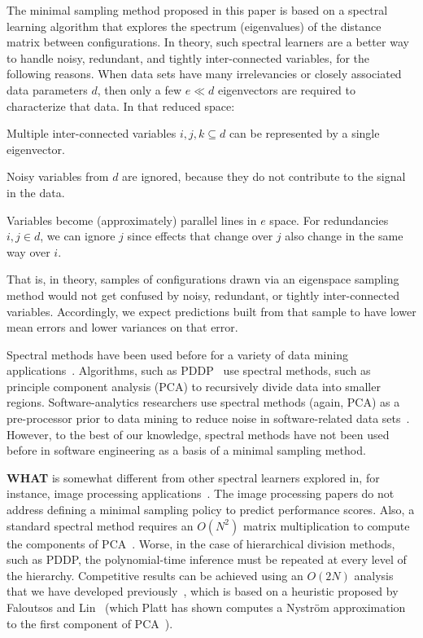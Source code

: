 \documentclass{sig-alternative}
\newcommand{\what}{{\bf WHAT }}
\begin{document}
The minimal sampling method proposed in this paper is based on a spectral learning algorithm
that  explores the spectrum (eigenvalues) of the distance matrix between  configurations.
In theory, such spectral learners are a better way to handle noisy, redundant, and tightly inter-connected variables, for the following reasons.
When data sets have many irrelevancies or closely associated data parameters $d$, then
only a few $e \ll d$ eigenvectors are required to characterize that data.
In that reduced space:
\begin{compactitem}
\item
Multiple inter-connected variables $i,j,k \subseteq d$ can be represented
by a single eigenvector.
\item
Noisy variables from $d$ are
ignored, because they  do not contribute to the signal in the data.
\item
Variables  become (approximately) parallel lines
in $e$ space. For  redundancies \mbox{$i,j \in d$}, we
can ignore $j$
since effects that change over $j$ also
change in the same way over $i$.
\end{compactitem}
That is, in theory, samples of configurations drawn via an eigenspace sampling method
would not get confused by noisy, redundant, or tightly inter-connected variables. Accordingly,
we expect predictions built from that sample to have  lower mean errors and lower variances on that error.

Spectral methods have been used before for a variety of data mining applications~\cite{kamvar2003spectral}.
Algorithms, such as PDDP~\cite{boley98} use spectral methods, such as principle component analysis (PCA) to
recursively divide data into smaller regions.  Software-analytics researchers use spectral methods (again, PCA) as a pre-processor prior to data mining  to reduce noise in software-related data sets~\cite{Theisen15}.
However, to the best of our knowledge, spectral methods have not been used before in software engineering as a basis of a minimal sampling method.


\what is somewhat different from other spectral
learners explored in, for instance, image processing applications~\cite{shi00}.
The image processing papers do not address
defining a minimal sampling policy to predict performance scores.
Also, a standard spectral method requires an $O(N^2)$ matrix multiplication to compute the components
of PCA~\cite{ilin10}. Worse, in the case of hierarchical division methods, such as PDDP,
the polynomial-time inference must be repeated at every level of the hierarchy.
Competitive results can be achieved
using an $O(2N)$ analysis that we have developed previously~\cite{me12d}, which is  based on  a heuristic proposed by Faloutsos and Lin~\cite{Faloutsos1995} (which Platt has shown computes a Nystr\"om approximation to the first component of PCA~\cite{platt05}).
\end{document}
